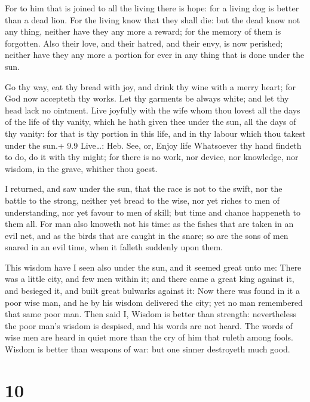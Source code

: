  For to him that is joined to all the living there is
hope: for a living dog is better than a dead lion.  For the
living know that they shall die: but the dead know not any thing,
neither have they any more a reward; for the memory of them is
forgotten.  Also their love, and their hatred, and their
envy, is now perished; neither have they any more a portion for ever in
any thing that is done under the sun.

 Go thy way, eat thy bread with joy, and drink thy wine
with a merry heart; for God now accepteth thy works.  Let
thy garments be always white; and let thy head lack no ointment.
 Live joyfully with the wife whom thou lovest all the days
of the life of thy vanity, which he hath given thee under the sun, all
the days of thy vanity: for that is thy portion in this life, and in thy
labour which thou takest under the sun.+ 9.9 Live\ldots: Heb. See, or,
Enjoy life  Whatsoever thy hand findeth to do, do it with
thy might; for there is no work, nor device, nor knowledge, nor wisdom,
in the grave, whither thou goest.

 I returned, and saw under the sun, that the race is not
to the swift, nor the battle to the strong, neither yet bread to the
wise, nor yet riches to men of understanding, nor yet favour to men of
skill; but time and chance happeneth to them all.  For man
also knoweth not his time: as the fishes that are taken in an evil net,
and as the birds that are caught in the snare; so are the sons of men
snared in an evil time, when it falleth suddenly upon them.

 This wisdom have I seen also under the sun, and it
seemed great unto me:  There was a little city, and few men
within it; and there came a great king against it, and besieged it, and
built great bulwarks against it:  Now there was found in it
a poor wise man, and he by his wisdom delivered the city; yet no man
remembered that same poor man.  Then said I, Wisdom is
better than strength: nevertheless the poor man's wisdom is despised,
and his words are not heard.  The words of wise men are
heard in quiet more than the cry of him that ruleth among fools.
 Wisdom is better than weapons of war: but one sinner
destroyeth much good.

\hypertarget{section-9}{%
\section{10}\label{section-9}}

